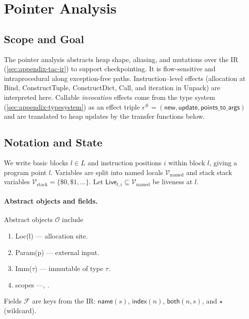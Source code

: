 \newpage
\section{Pointer Analysis}
\label{sec:appendix-pointer}

\subsection{Scope and Goal}

The pointer analysis abstracts heap shape, aliasing, and mutations over the \spytecode IR
(\autoref{sec:appendix-tac-ir}) to support checkpointing. It is
flow-sensitive and intraprocedural along exception-free paths.
Instruction–level effects (allocation at \textsf{Bind}, \textsf{ConstructTuple},
\textsf{ConstructDict}, \textsf{Call}, and iteration in \textsf{Unpack}) are interpreted here.
Callable \emph{invocation} effects come from the type system
(\autoref{sec:appendix-typesystem}) as an effect triple
\(\epsilon^\#=(\mathsf{new},\mathsf{update},\mathsf{points\_to\_args})\) and are translated to
heap updates by the transfer functions below.

\subsection{Notation and State}

We write basic blocks \(l\in L\) and instruction positions \(i\) within block \(l\), giving a
program point \(l\).
Variables are split into named locals \(\mathcal{V}_{\mathrm{named}}\) and stack stack variables
\(\mathcal{V}_{\mathrm{stack}}=\{\$0,\$1,\ldots\}\).
Let \(\mathsf{Live}_{l,i}\subseteq \mathcal{V}_{\mathrm{named}}\) be liveness at \(l\).

\paragraph{Abstract objects and fields.}
Abstract objects \(\mathcal{O}\) include
\begin{enumerate}
    \item \textsf{Loc}(l) --- allocation site.
    \item \textsf{Param}(p) --- external input.
    \item \textsf{Imm}($\tau$) --- immutable of type $\tau$.
    \item scopes ---\tLOCALS, \tGLOBALS.
\end{enumerate}

Fields \(\mathcal{F}\) are keys from the IR:
\(\mathsf{name}(s)\), \(\mathsf{index}(n)\), \(\mathsf{both}(n,s)\), and \(\star\) (wildcard).

